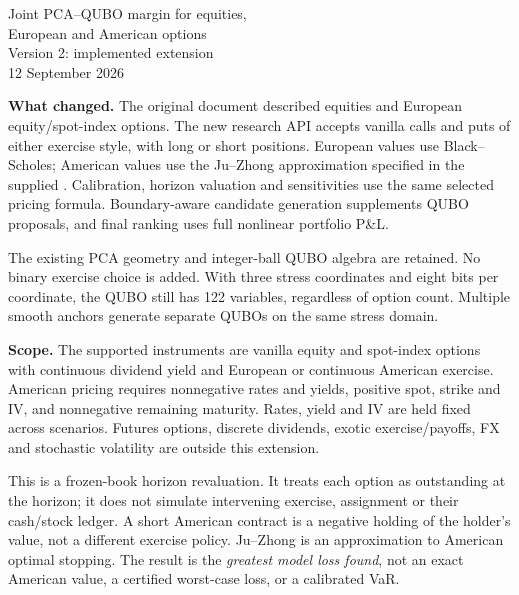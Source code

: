 \documentclass[11pt,a4paper]{article}
\begin{document}
\begin{center}
{\Large Joint PCA--QUBO margin for equities,\\European and American options}\\[5pt]
{\large Version 2: implemented extension}\\[4pt]
{\small 12 September 2026}
\end{center}

\textbf{What changed.}
The original document described equities and European equity/spot-index options.
The new research API accepts vanilla calls and puts of either exercise style,
with long or short positions. European values use Black--Scholes; American values
use the Ju--Zhong approximation specified in the supplied
. Calibration, horizon valuation and sensitivities
use the same selected pricing formula. Boundary-aware candidate generation
supplements QUBO proposals, and final ranking uses full nonlinear portfolio P\&L.

The existing PCA geometry and integer-ball QUBO algebra are retained. No binary
exercise choice is added. With three stress coordinates and eight bits per
coordinate, the QUBO still has 122 variables, regardless of option count.
Multiple smooth anchors generate separate QUBOs on the same stress domain.

\textbf{Scope.}
The supported instruments are vanilla equity and spot-index options with
continuous dividend yield and European or continuous American exercise.
American pricing requires nonnegative rates and yields, positive spot, strike
and IV, and nonnegative remaining maturity. Rates, yield and IV are held fixed
across scenarios. Futures options, discrete dividends, exotic exercise/payoffs,
FX and stochastic volatility are outside this extension.

This is a frozen-book horizon revaluation. It treats each option as outstanding
at the horizon; it does not simulate intervening exercise, assignment or their
cash/stock ledger. A short American contract is a negative holding of the
holder's value, not a different exercise policy. Ju--Zhong is an approximation
to American optimal stopping. The result is the \emph{greatest model loss found},
not an exact American value, a certified worst-case loss, or a calibrated VaR.
\end{document}
